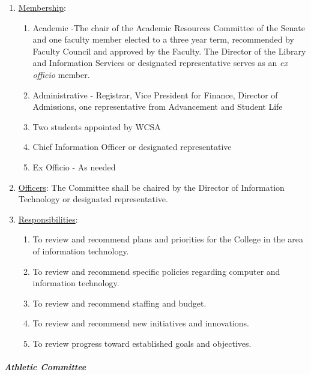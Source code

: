 					\begin{enumerate}[label=\alph*)]
						\item{\underline{Membership}:
							\begin{enumerate}[label=\arabic*)]
								\item{Academic -The chair of the Academic
									Resources Committee of the Senate and one
									faculty member elected to a three year term,
									recommended by Faculty Council and approved by
									the Faculty.  The Director of the Library and
									Information Services or designated
									representative serves as an \emph{ex officio} member.}
								\item{Administrative - Registrar, Vice President for Finance, Director of Admissions, one representative from Advancement and Student Life}
								\item{Two students appointed by WCSA}
								\item{Chief Information Officer or designated representative}
								\item{Ex Officio - As needed}
							\end{enumerate}
						}
						\item{\underline{Officers}:
							The Committee shall be chaired by the Director of Information Technology or designated representative.
						}
						\item{\underline{Responsibilities}:
							\begin{enumerate}[label=\arabic*)]
								\item{To review and recommend plans and priorities for the College in the area of information technology.}
								\item{To review and recommend specific policies regarding computer and information technology.}
								\item{To review and recommend staffing and budget.}
								\item{To review and recommend new initiatives and innovations.}
								\item{To review progress toward established goals and objectives.}
							\end{enumerate}
						}
					\end{enumerate}
				\subparagraph{Athletic Committee}
